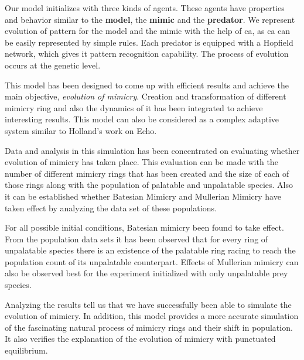 \documentclass[letterpaper]{article}
\numberwithin{equation}{section}
\begin{document}
Our model initializes with three kinds of agents. These agents have properties and behavior similar to the \textbf{model}, the \textbf{mimic} and the \textbf{predator}. We represent evolution of pattern for the model and the mimic with the help of \gls{ca}, as \gls{ca} can be easily represented by simple rules. Each predator is equipped with a Hopfield network, which gives it pattern recognition capability. The process of evolution occurs at the genetic level. 

This model has been designed to come up with efficient results and achieve the main objective, \textit{evolution of mimicry}. Creation and transformation of different mimicry ring and also the dynamics of it has been integrated to achieve interesting results. This model can also be considered as a complex adaptive system similar to Holland's work on Echo.

Data and analysis in this simulation has been concentrated on evaluating whether evolution of mimicry has taken place. This evaluation can be made with the number of different mimicry rings that has been created and the size of each of those rings along with the population of palatable and unpalatable species. Also it can be established whether Batesian Mimicry and Mullerian Mimicry have taken effect by analyzing the data set of these populations.

For all possible initial conditions, Batesian mimicry been found to take effect. From the population data sets it has been observed that for every ring of unpalatable species there is an existence of the palatable ring racing to reach the population count of its unpalatable counterpart. Effects of Mullerian mimicry can also be observed best for the experiment initialized with only unpalatable prey species. 

Analyzing the results tell us that we have successfully been able to simulate the evolution of mimicry. In addition, this model provides a more accurate simulation of the fascinating natural process of mimicry rings and their shift in population. It also verifies the explanation of the evolution of mimicry with punctuated equilibrium.
\printglossaries
{} \label{acronyms}
\end{document}
